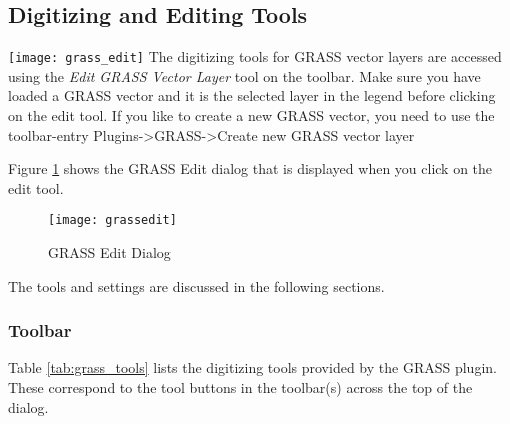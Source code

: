 \subsection{Digitizing and Editing Tools}
\label{grass_digitising}

\texttt{[image: grass\_edit]} The digitizing tools for GRASS vector layers are accessed using the
\textsl{Edit GRASS Vector Layer} tool on the toolbar. Make sure you have
loaded a GRASS vector and it is the selected layer in the legend before
clicking on the edit tool. 
If you like to create a new GRASS vector, you need to use the toolbar-entry
Plugins->GRASS->Create new GRASS vector layer

Figure \ref{fig:grass_edit} shows the GRASS Edit dialog that
is displayed when you click on the edit tool. 

\begin{figure}[h]
   \begin{center}
   \caption{GRASS Edit Dialog}\label{fig:grass_edit}\smallskip
   \texttt{[image: grassedit]}
\end{center}  
\end{figure}

The tools and settings are discussed in the following sections.

\subsubsection{Toolbar}\label{label_grasstoolbar}

Table \ref{tab:grass_tools} lists the digitizing tools provided by the GRASS
plugin. These correspond to the tool buttons in the toolbar(s) across the top
of the dialog.

